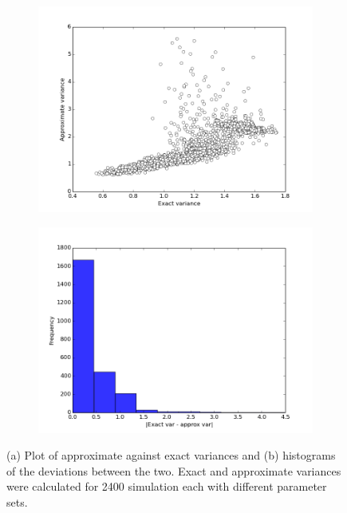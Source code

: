\documentclass[a4paper,12pt]{article}
\begin{document}
\begin{figure}[!ht]
        \centering
        \begin{subfigure}[!ht]{0.7\textwidth}
                \includegraphics[width=\textwidth]{images/approx_exact_var}
                \caption{}
                \label{fig:approx_exact_var}
        \end{subfigure}%
        
        \begin{subfigure}[b]{0.7\textwidth}
                \includegraphics[width=\textwidth]{images/approx_var_dev}
                \caption{}
                \label{fig:approx_var_dev}
        \end{subfigure}
        
\caption{(a) Plot of approximate against exact variances and (b) histograms of the deviations between the two. Exact and approximate variances were calculated for 2400 simulation each with different parameter sets.}
\label{fig:dev_hists}
\end{figure}
\end{document}
